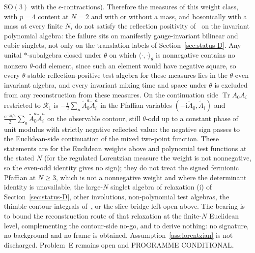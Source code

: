 \(\mathrm{SO}(3)\) with the \(\epsilon\)-contractions). Therefore the measures of
this weight class, with \(p=4\) content at \(N=2\) and with or without a mass, and
bosonically with a mass at every finite \(N\), do not satisfy the reflection
positivity of~\cite{OsterwalderSchrader1973,OsterwalderSchrader1975} on the
invariant polynomial algebra: the failure sits on manifestly gauge-invariant
bilinear and cubic singlets, not only on the translation labels of
Section~\ref{sec:status-D}. Any unital \(*\)-subalgebra closed under \(\theta\) on which \(\langle\cdot,\cdot\rangle_\theta\) is nonnegative contains no nonzero \(\theta\)-odd element, since such an element would have negative square, so every \(\theta\)-stable reflection-positive test algebra for these measures lies in the \(\theta\)-even invariant algebra, and every invariant mixing time and space under \(\theta\) is excluded from any reconstruction from these measures. On the
continuation side \(\operatorname{Tr}A_0A_i\) restricted to \(\mathcal R_1\) is
\(-\frac{\mathrm i}2\sum_a\tilde A^a_0\tilde A^a_i\) in the Pfaffian variables
\((-\mathrm i\tilde A_0,\tilde A_i)\) and \(\frac{\mathrm e^{-\pi\mathrm
i/4}}2\sum_a\tilde A^a_0\tilde A^a_i\) on the observable contour, still
\(\theta\)-odd up to a constant phase of unit modulus with strictly negative
reflected value: the negative sign passes to the Euclidean-side continuation of the
mixed two-point function. These statements are for the Euclidean weights above and
polynomial test functions at the stated \(N\) (for the regulated Lorentzian measure
the weight is not nonnegative, so the even-odd identity gives no sign); they do not
treat the signed fermionic Pfaffian at \(N\ge3\), which is not a nonnegative weight
and where the determinant identity is unavailable, the large-\(N\) singlet algebra
of relaxation (i) of Section~\ref{sec:status-D}, other involutions, non-polynomial
test algebras, the thimble contour integrals of~\cite{ChouNishimuraTripathi2025}, or
the slice bridge left open above. The bearing is to bound the reconstruction route
of that relaxation at the finite-\(N\) Euclidean level, complementing the
contour-side no-go, and to derive nothing: no signature, no background and no frame
is obtained, Assumption~\ref{ass:lorentzian} is not discharged. Problem~E remains
open and PROGRAMME CONDITIONAL.




